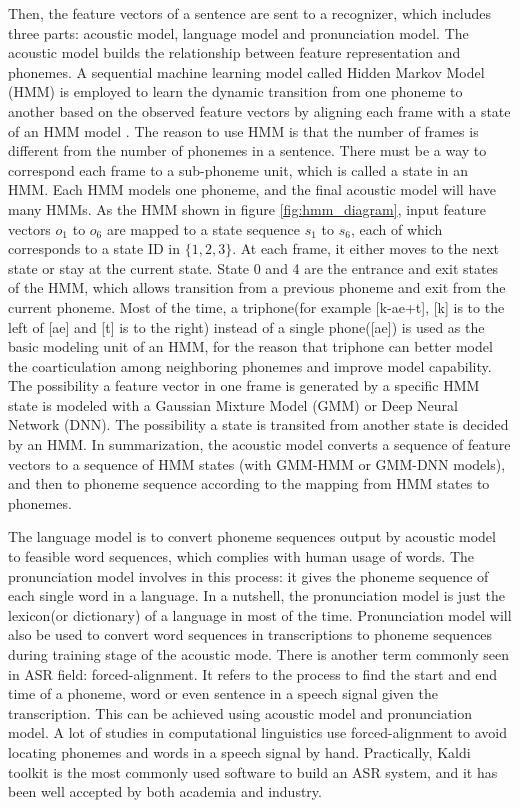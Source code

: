  Then, the feature vectors of a sentence are sent to a recognizer, which includes three parts: acoustic model, language model and pronunciation model. The acoustic model builds the relationship between feature representation and phonemes. A sequential machine learning model called Hidden Markov Model (HMM) is employed to learn the dynamic transition from one phoneme to another based on the observed feature vectors by aligning each frame with a state of an HMM model \citep{rabiner1989tutorial}. The reason to use HMM is that the number of frames is different from the number of phonemes in a sentence. There must be a way to correspond each frame to a sub-phoneme unit, which is called a state in an HMM. Each HMM models one phoneme, and the final acoustic model will have many HMMs. As the HMM shown in figure \ref{fig:hmm_diagram}, input feature vectors $o_1$ to $o_6$ are mapped to a state sequence $s_1$ to $s_6$, each of which corresponds to a state ID in $\{1,2,3\}$. At each frame, it either moves to the next state or stay at the current state. State 0 and 4 are the entrance and exit states of the HMM, which allows transition from a previous phoneme and exit from the current phoneme. Most of the time, a triphone(for example [k-ae+t], [k] is to the left of [ae] and [t] is to the right) instead of a single phone([ae]) is used as the basic modeling unit of an HMM, for the reason that triphone can better model the coarticulation among neighboring phonemes and improve model capability. The possibility a feature vector in one frame is generated by a specific HMM state is modeled with a Gaussian Mixture Model (GMM) or Deep Neural Network (DNN). The possibility a state is transited from another state is decided by an HMM. In summarization, the acoustic model converts a sequence of feature vectors to a sequence of HMM states (with GMM-HMM or GMM-DNN models), and then to phoneme sequence according to the mapping from HMM states to phonemes.

 The language model is to convert phoneme sequences output by acoustic model to feasible word sequences, which complies with human usage of words. The pronunciation model involves in this process: it gives the phoneme sequence of each single word in a language. In a nutshell, the pronunciation model is just the lexicon(or dictionary) of a language in most of the time. Pronunciation model will also be used to convert word sequences in transcriptions to phoneme sequences during training stage of the acoustic mode. There is another term commonly seen in ASR field: forced-alignment. It refers to the process to find the start and end time of a phoneme, word or even sentence in a speech signal given the transcription. This can be achieved using acoustic model and pronunciation model. A lot of studies in computational linguistics use forced-alignment to avoid locating phonemes and words in a speech signal by hand. Practically, Kaldi toolkit \citep{povey2011kaldi} is the most commonly used software to build an ASR system, and it has been well accepted by both academia and industry.

